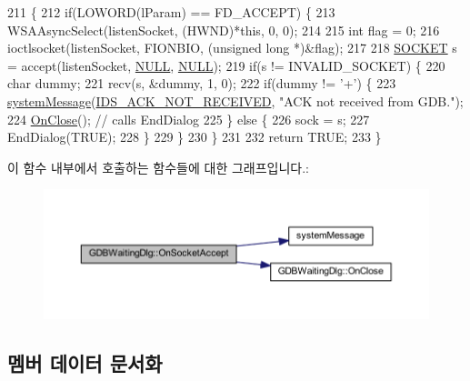 \begin{DoxyCode}
211 \{
212   \textcolor{keywordflow}{if}(LOWORD(lParam) == FD\_ACCEPT) \{
213     WSAAsyncSelect(listenSocket, (HWND)*\textcolor{keyword}{this}, 0, 0);
214     
215     \textcolor{keywordtype}{int} flag = 0;    
216     ioctlsocket(listenSocket, FIONBIO, (\textcolor{keywordtype}{unsigned} \textcolor{keywordtype}{long} *)&flag);
217     
218     \mbox{\hyperlink{remote_8cpp_aff55fe551a9992a54ec54621c524d0a4}{SOCKET}} s = accept(listenSocket, \mbox{\hyperlink{getopt1_8c_a070d2ce7b6bb7e5c05602aa8c308d0c4}{NULL}}, \mbox{\hyperlink{getopt1_8c_a070d2ce7b6bb7e5c05602aa8c308d0c4}{NULL}});
219     \textcolor{keywordflow}{if}(s != INVALID\_SOCKET) \{
220       \textcolor{keywordtype}{char} dummy;
221       recv(s, &dummy, 1, 0);
222       \textcolor{keywordflow}{if}(dummy != \textcolor{charliteral}{'+'}) \{
223         \mbox{\hyperlink{system_8cpp_a747a9cb8e015a3d45cca636b5bd0fc69}{systemMessage}}(\mbox{\hyperlink{resource_8h_ac851bf7cf47b2e3d1819d5f903f82e67}{IDS\_ACK\_NOT\_RECEIVED}}, \textcolor{stringliteral}{"ACK not received from GDB."});
224         \mbox{\hyperlink{class_g_d_b_waiting_dlg_a9f08e30520f95b333ba224ebd41c47e3}{OnClose}}(); \textcolor{comment}{// calls EndDialog}
225       \} \textcolor{keywordflow}{else} \{
226         sock = s;
227         EndDialog(TRUE);
228       \}
229     \}
230   \}
231 
232   \textcolor{keywordflow}{return} TRUE;
233 \}
\end{DoxyCode}
이 함수 내부에서 호출하는 함수들에 대한 그래프입니다.\+:
\nopagebreak
\begin{figure}[H]
\begin{center}
\leavevmode
\includegraphics[width=350pt]{class_g_d_b_waiting_dlg_a086e273c913d5f12449f04a80956d9ee_cgraph}
\end{center}
\end{figure}


\subsection{멤버 데이터 문서화}
\mbox{\label{class_g_d_b_waiting_dlg_a3acb8dcd210dc9bb20df25b0ebb6dc4e}} 
